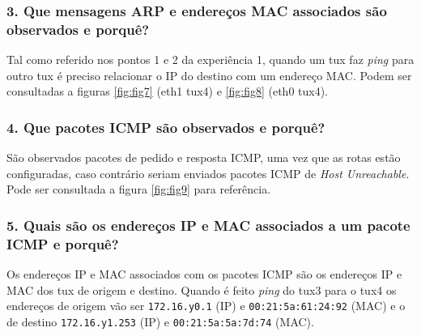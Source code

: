 \subsubsection{3. Que mensagens ARP e endereços MAC associados são observados e porquê?}
Tal como referido nos pontos 1 e 2 da experiência 1, quando um tux faz \emph{ping} para outro tux é preciso relacionar o IP do destino com um endereço MAC. Podem ser consultadas a figuras \ref{fig:fig7} (eth1 tux4) e \ref{fig:fig8} (eth0 tux4).

\subsubsection{4. Que pacotes ICMP são observados e porquê?}
São observados pacotes de pedido e resposta ICMP, uma vez que as rotas estão configuradas, caso contrário seriam enviados pacotes ICMP de \emph{Host Unreachable}. Pode ser consultada a figura \ref{fig:fig9} para referência.

\subsubsection{5. Quais são os endereços IP e MAC associados a um pacote ICMP e porquê?}
Os endereços IP e MAC associados com os pacotes ICMP são os endereços IP e MAC dos tux de origem e destino. Quando é feito \emph{ping} do tux3 para o tux4 os endereços de origem vão ser \verb+172.16.y0.1+ (IP) e \verb+00:21:5a:61:24:92+ (MAC) e o de destino \verb+172.16.y1.253+ (IP) e \verb+00:21:5a:5a:7d:74+ (MAC).

